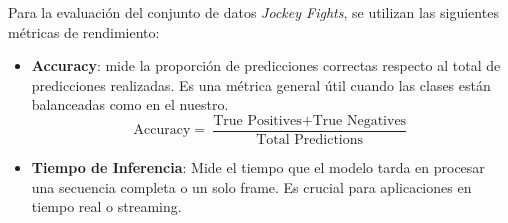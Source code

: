 Para la evaluación del conjunto de datos 
\textit{Jockey Fights}, se utilizan las siguientes 
métricas de rendimiento:

\begin{itemize}
    \item \textbf{Accuracy}: mide la proporción de predicciones 
    correctas respecto al total de predicciones realizadas. Es 
    una métrica general útil cuando las clases están balanceadas 
    como en el nuestro.
    \begin{equation}
        \text{Accuracy} = \frac{\text{True Positives} + \text{True Negatives}}{\text{Total Predictions}}
    \end{equation}
    \item \textbf{Tiempo de Inferencia}: Mide el tiempo que 
    el modelo tarda en procesar una secuencia completa o un 
    solo frame. Es crucial para aplicaciones en tiempo real 
    o streaming.

\end{itemize}
